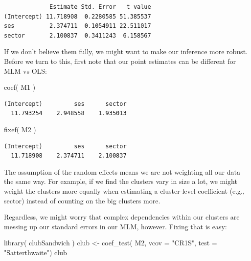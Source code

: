 \documentclass[
  letterpaper,
  DIV=11,
  numbers=noendperiod]{scrreprt}
\newenvironment{Shaded}{}{}
\newcommand{\AttributeTok}[1]{\textcolor[rgb]{0.49,0.56,0.16}{#1}}
\newcommand{\FunctionTok}[1]{\textcolor[rgb]{0.02,0.16,0.49}{#1}}
\newcommand{\NormalTok}[1]{#1}
\newcommand{\OtherTok}[1]{\textcolor[rgb]{0.00,0.44,0.13}{#1}}
\newcommand{\StringTok}[1]{\textcolor[rgb]{0.25,0.44,0.63}{#1}}
\begin{document}
\begin{verbatim}
             Estimate Std. Error   t value
(Intercept) 11.718908  0.2280585 51.385537
ses          2.374711  0.1054911 22.511017
sector       2.100837  0.3411243  6.158567
\end{verbatim}

If we don't believe them fully, we might want to make our inference more
robust. Before we turn to this, first note that our point estimates can
be different for MLM vs OLS:

\begin{Shaded}
\begin{Highlighting}[]
\FunctionTok{coef}\NormalTok{( M1 )}
\end{Highlighting}
\end{Shaded}

\begin{verbatim}
(Intercept)         ses      sector 
  11.793254    2.948558    1.935013 
\end{verbatim}

\begin{Shaded}
\begin{Highlighting}[]
\FunctionTok{fixef}\NormalTok{( M2 )}
\end{Highlighting}
\end{Shaded}

\begin{verbatim}
(Intercept)         ses      sector 
  11.718908    2.374711    2.100837 
\end{verbatim}

The assumption of the random effects means we are not weighting all our
data the same way. For example, if we find the clusters vary in size a
lot, we might weight the clusters more equally when estimating a
cluster-level coefficient (e.g., sector) instead of counting on the big
clusters more.

Regardless, we might worry that complex dependencies within our clusters
are messing up our standard errors in our MLM, however. Fixing that is
easy:

\begin{Shaded}
\begin{Highlighting}[]
\FunctionTok{library}\NormalTok{( clubSandwich )}
\NormalTok{club }\OtherTok{\textless{}{-}} \FunctionTok{coef\_test}\NormalTok{( M2,}
           \AttributeTok{vcov =} \StringTok{"CR1S"}\NormalTok{,}
           \AttributeTok{test =} \StringTok{"Satterthwaite"}\NormalTok{)}
\NormalTok{club}
\end{Highlighting}
\end{Shaded}
\end{document}
